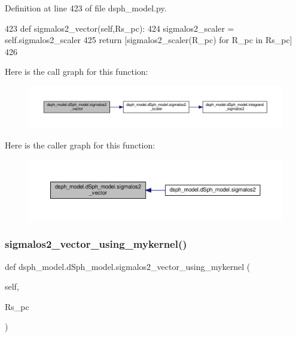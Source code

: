 Definition at line 423 of file dsph\+\_\+model.\+py.


\begin{DoxyCode}
423     \textcolor{keyword}{def }sigmalos2\_vector(self,Rs\_pc):
424         sigmalos2\_scaler = self.sigmalos2\_scaler
425         \textcolor{keywordflow}{return} [sigmalos2\_scaler(R\_pc) \textcolor{keywordflow}{for} R\_pc \textcolor{keywordflow}{in} Rs\_pc]
426     
\end{DoxyCode}
Here is the call graph for this function\+:\nopagebreak
\begin{figure}[H]
\begin{center}
\leavevmode
\includegraphics[width=350pt]{d0/d25/classdsph__model_1_1dSph__model_a5170edb309402dc101ea76871645e65f_cgraph}
\end{center}
\end{figure}
Here is the caller graph for this function\+:\nopagebreak
\begin{figure}[H]
\begin{center}
\leavevmode
\includegraphics[width=350pt]{d0/d25/classdsph__model_1_1dSph__model_a5170edb309402dc101ea76871645e65f_icgraph}
\end{center}
\end{figure}
\mbox{\label{classdsph__model_1_1dSph__model_a00cd796cf178fe8b3435e941976e8f27}} 
\subsubsection{\texorpdfstring{sigmalos2\+\_\+vector\+\_\+using\+\_\+mykernel()}{sigmalos2\_vector\_using\_mykernel()}}
{\footnotesize\ttfamily def dsph\+\_\+model.\+d\+Sph\+\_\+model.\+sigmalos2\+\_\+vector\+\_\+using\+\_\+mykernel (\begin{DoxyParamCaption}\item[{}]{self,  }\item[{}]{Rs\+\_\+pc }\end{DoxyParamCaption})}



